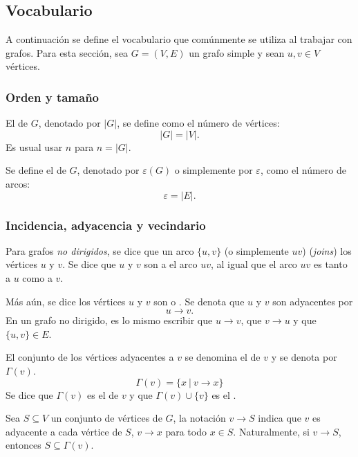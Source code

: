 \subsection{Vocabulario}

A continuación se define el vocabulario que comúnmente se utiliza al trabajar con grafos. Para esta sección, sea \(G=(V,E)\) un grafo simple y sean \(u, v \in V\) vértices.

\subsubsection{Orden y tamaño}

El  de \(G\), denotado por \(|G|\), se define como el número de vértices: \[|G| = |V|.\] Es usual usar \(n\) para \(n = |G|\).

Se define el  de \(G\), denotado por \(\varepsilon(G)\) o simplemente por \(\varepsilon\), como el número de arcos: \[\varepsilon = |E|.\]

\subsubsection{Incidencia, adyacencia y vecindario}
\label{sec:adyacencia}

Para grafos \emph{no dirigidos}, se dice que un arco \(\{u,v\}\) (o simplemente \(uv\))  (\textit{joins}) los vértices \(u\) y \(v\). Se dice que \(u\) y \(v\) son  a el arco \(uv\), al igual que el arco \(uv\) es  tanto a \(u\) como a \(v\).

Más aún, se dice los vértices \(u\) y \(v\) son  o . Se denota que \(u\) y \(v\) son adyacentes por \[u \longrightarrow v.\]
En un grafo no dirigido, es lo mismo escribir que \(u\longrightarrow v\), que \(v \longrightarrow u\) y que \(\{u,v\} \in E\).

El conjunto de los vértices adyacentes a \(v\) se denomina el  de \(v\) y se denota por \(\Gamma(v)\). \[\Gamma(v) = \{x \ | \ v \longrightarrow x\}\] Se dice que \(\Gamma(v)\) es el  de \(v\) y que \(\Gamma(v) \cup \{v\}\) es el .

Sea \(S \subseteq V\) un conjunto de vértices de \(G\), la notación \(v\longrightarrow S\) indica que \(v\) es adyacente a cada vértice de \(S\), \(v\longrightarrow x\) para todo \(x \in S\). Naturalmente, si \(v \longrightarrow S\), entonces \(S \subseteq \Gamma(v)\).

